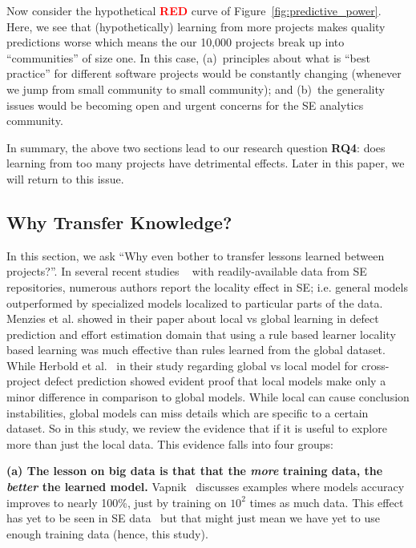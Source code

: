 \documentclass[10pt,journal,compsoc]{IEEEtran}
\begin{document}
Now consider the hypothetical \textcolor{red}{{\bf RED}} curve of Figure~\ref{fig:predictive_power}. Here, we see that (hypothetically)  learning from more projects makes quality predictions worse which means the our 10,000 projects break up into ``communities'' of size one. In this case,  (a)~principles about what is ``best practice'' for different software projects would be constantly changing (whenever we jump from small community to small community); and (b)~the generality issues would be becoming open and urgent concerns for the SE analytics community.

In summary, the above two sections lead to our  research question {\bf  RQ4}:
does learning from too many projects have detrimental effects. Later in this
paper, we will return to this issue.

\subsection{Why Transfer Knowledge?}
\label{sec:related}

In this section, we ask ``Why even bother to transfer lessons learned between projects?''. In several recent studies ~\cite{bettenburg2012think, menzies2012local, posnett2011ecological} with readily-available data from SE repositories, numerous authors report the locality effect in SE; i.e. general models outperformed by specialized models localized to particular parts of the data. Menzies et al. showed in their paper about local vs global learning in defect prediction and effort estimation domain that using a rule based learner locality based learning was much effective than rules learned from the global dataset. While Herbold et al.~\cite{herbold2017global} in their study regarding global vs local model for cross-project defect prediction showed evident proof that local models make only a minor difference in comparison to global models. While local can cause conclusion instabilities, global models can miss details which are specific to a certain dataset. So in this study, we review the evidence that if it is useful to explore more than just the local data. This evidence falls into four groups:

\textbf{(a) The lesson on big data is that that the {\em more} training data, the {\em better} the learned model.} Vapnik~\cite{vapnik14} discusses examples where models accuracy improves to nearly 100\%, just by training on $10^2$ times as much data. This effect has yet to be seen in SE data~\cite{menzies2013guest} but that might just mean we have yet to use enough training data (hence, this study). 
\end{document}
